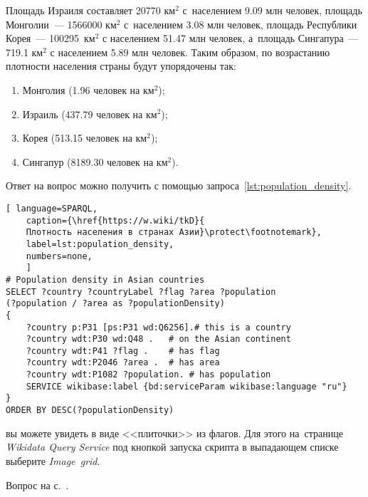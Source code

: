\begin{task}
\label{answer:population_density}
%
Площадь Израиля составляет \num{20770} км$^2$ с~населением \num{9.09} млн человек, 
    площадь Монголии~--- \num{1566000} км$^2$ с~населением \num{3.08} млн человек, 
    площадь Республики Корея~--- \num{100295}~км$^2$ с населением \num{51.47} млн человек, 
    а~площадь Сингапура~--- \num{719.1} км$^2$ с населением \num{5.89} млн человек. 
    Таким образом, по возрастанию плотности населения страны будут упорядочены так:
		\begin{enumerate}
            \item Монголия (\num{1.96} человек на км$^2$);
			\item Израиль (\num{437.79} человек на км$^2$);
			\item Корея (\num{513.15} человек на км$^2$);
			\item Сингапур (\num{8189.30} человек на км$^2$).
		\end{enumerate}
	
Ответ на вопрос можно получить с помощью запроса~\ref{lst:population_density}.
	
	\begin{lstlisting}[ language=SPARQL, 
	caption={\href{https://w.wiki/tkD}{
	Плотность населения в странах Азии}\protect\footnotemark},
	label=lst:population_density,
    numbers=none,
	]
# Population density in Asian countries
SELECT ?country ?countryLabel ?flag ?area ?population 
(?population / ?area as ?populationDensity)
{
	?country p:P31 [ps:P31 wd:Q6256].# this is a country
	?country wdt:P30 wd:Q48 .   # on the Asian continent 
	?country wdt:P41 ?flag .    # has flag
	?country wdt:P2046 ?area .  # has area
	?country wdt:P1082 ?population. # has population  
	SERVICE wikibase:label {bd:serviceParam wikibase:language "ru"}
}
ORDER BY DESC(?populationDensity)
\end{lstlisting}
	
	
 вы можете увидеть в виде <<плиточки>> из флагов. 
Для этого на~странице \emph{Wikidata Query Service} под кнопкой запуска скрипта 
в выпадающем списке выберите  \emph{Image~grid}.
	
\small{\AnswerBackref Вопрос на с.~\pageref{lst:without_inception}.}
\end{task}



